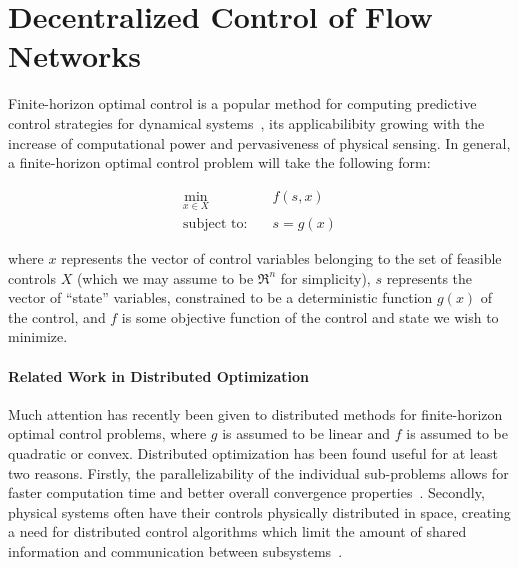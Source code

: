 \section{Decentralized Control of Flow Networks}
\label{sec:admm-intro}

Finite-horizon optimal control is a popular method for computing predictive control strategies for dynamical systems~\cite{Reilly2013AdjointBased,Bayen2006AdjointBased,Raffard2008AdjointBased}, its applicabilibity growing with the increase of computational power and pervasiveness of physical sensing. In general, a finite-horizon optimal control problem will take the following form:

\begin{align}
	\label{eq:fhop}
	\min_{x\in X} & \quad f\left(s, x\right) \\
	\text{subject to:} & \quad s = g\left(x\right)
\end{align}

where $x$ represents the vector of control variables belonging to the set of feasible controls $X$ (which we may assume to be $\Re^n$ for simplicity), $s$ represents the vector of ``state'' variables, constrained to be a deterministic function $g\left(x\right)$ of the control, and $f$ is some objective function of the control and state we wish to minimize.

\paragraph*{Related Work in Distributed Optimization}
Much attention has recently been given to distributed methods for finite-horizon optimal control problems, where $g$ is assumed to be linear and $f$ is assumed to be quadratic or convex. Distributed optimization has been found useful for at least two reasons. Firstly, the parallelizability of the individual sub-problems allows for faster computation time and better overall convergence properties~\cite{Donoghue2013Splitting,Frejo2011Feasible,Pu2014Fast,Giselsson2013Accelerated}. Secondly, physical systems often have their controls physically distributed in space, creating a need for distributed control algorithms which limit the amount of shared information and communication between subsystems~\cite{Venkat2008Distributed,mota2012distributed,camponogara2009distributed}.


